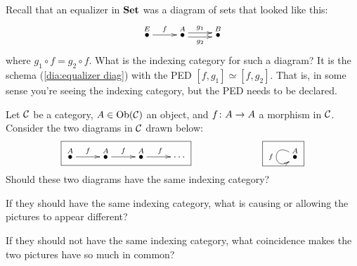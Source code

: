 \documentclass[CT4S-EN-RU]{subfiles}
\begin{document}
\begin{exerciseRUS}
\end{exerciseRUS}

\begin{exampleENG}
Recall that an equalizer in ${\mathbf{Set}}$ was a diagram of sets that looked like this:
\begin{align}\label{dia:equalizer diag}
\xymatrix{\LMO{E}\ar[r]^f&\LMO{A}\ar@<.5ex>[r]^{g_1}\ar@<-.5ex>[r]_{g_2}&\LMO{B}}
\end{align}
where $g_1\circ f=g_2\circ f$. What is the indexing category for such a diagram? It is the schema (\ref{dia:equalizer diag}) with the PED $[f,g_1]\simeq[f,g_2]$. That is, in some sense you're seeing the indexing category, but the PED needs to be declared.
\end{exampleENG}

\begin{exampleRUS}
\end{exampleRUS}

\begin{exerciseENG}\label{exc:coincidence}
Let $\mathcal{C}$ be a category, $A\in\textnormal{Ob}(\mathcal{C})$ an object, and $f\colon A\rightarrow A$ a morphism in $\mathcal{C}$. Consider the two diagrams in $\mathcal{C}$ drawn below:
$$\fbox{\xymatrix{\LMO{A}\ar[r]^f&\LMO{A}\ar[r]^f&\LMO{A}\ar[r]^f&\cdots}}\hspace{1in}\fbox{\xymatrix{\LMO{A}\ar@(ul,dl)[]_f}}$$
\sexc Should these two diagrams have the same indexing category?
\item If they should have the same indexing category, what is causing or allowing the pictures to appear different?
\item If they should not have the same indexing category, what coincidence makes the two pictures have so much in common?
\endsexc
\end{exerciseENG}

\begin{exerciseRUS}\label{exc:coincidence}
\end{exerciseRUS}
\end{document}
